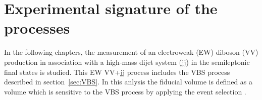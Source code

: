 \chapter{Experimental signature of the processes}
\label{chap:sigbkg}
In the following chapters, the measurement of an electroweak (EW) diboson (VV) production in association with a high-mass dijet system (jj) in the semileptonic final states is studied.
This EW VV+jj process includes the VBS process described in section~\ref{sec:VBS}.
In this anlysis the fiducial volume is defined as a volume which is sensitive to the VBS process by applying the event selection .
